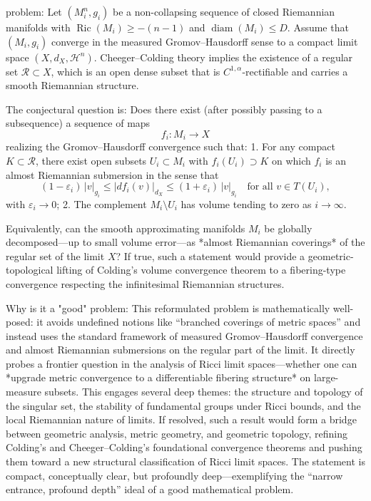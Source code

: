 problem:  
Let \((M_i^n, g_i)\) be a non-collapsing sequence of closed Riemannian manifolds with 
\(\operatorname{Ric}(M_i) \geq -(n-1)\) and \(\operatorname{diam}(M_i) \le D\).  
Assume that \((M_i, g_i)\) converge in the measured Gromov–Hausdorff sense to a compact limit space \((X, d_X, \mathcal{H}^n)\).  
Cheeger–Colding theory implies the existence of a regular set \(\mathcal{R} \subset X\), which is an open dense subset that is \(C^{1,\alpha}\)-rectifiable and carries a smooth Riemannian structure.  

The conjectural question is:  
Does there exist (after possibly passing to a subsequence) a sequence of maps  
\[
f_i : M_i \to X
\]  
realizing the Gromov–Hausdorff convergence such that:  
1. For any compact \(K \subset \mathcal{R}\), there exist open subsets \(U_i \subset M_i\) with \(f_i(U_i)\supset K\) on which \(f_i\) is an almost Riemannian submersion in the sense that  
   \[
   (1-\varepsilon_i)\, |v|_{g_i} \le |df_i(v)|_{d_X} \le (1+\varepsilon_i)\, |v|_{g_i} \quad \text{for all } v\in T(U_i),
   \]
   with \(\varepsilon_i \to 0\);  
2. The complement \(M_i \setminus U_i\) has volume tending to zero as \(i\to\infty\).  

Equivalently, can the smooth approximating manifolds \(M_i\) be globally decomposed—up to small volume error—as *almost Riemannian coverings* of the regular set of the limit \(X\)?  
If true, such a statement would provide a geometric-topological lifting of Colding’s volume convergence theorem to a fibering-type convergence respecting the infinitesimal Riemannian structures.

Why is it a "good" problem:  
This reformulated problem is mathematically well-posed: it avoids undefined notions like “branched coverings of metric spaces” and instead uses the standard framework of measured Gromov–Hausdorff convergence and almost Riemannian submersions on the regular part of the limit. It directly probes a frontier question in the analysis of Ricci limit spaces—whether one can *upgrade metric convergence to a differentiable fibering structure* on large-measure subsets. This engages several deep themes: the structure and topology of the singular set, the stability of fundamental groups under Ricci bounds, and the local Riemannian nature of limits. If resolved, such a result would form a bridge between geometric analysis, metric geometry, and geometric topology, refining Colding’s and Cheeger–Colding’s foundational convergence theorems and pushing them toward a new structural classification of Ricci limit spaces. The statement is compact, conceptually clear, but profoundly deep—exemplifying the “narrow entrance, profound depth” ideal of a good mathematical problem.